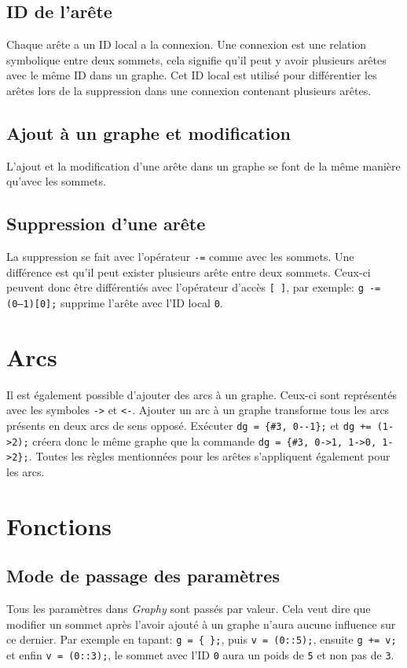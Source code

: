 \documentclass[french]{article}
\begin{document}
		\subsection{ID de l'arête}
		Chaque arête a un ID local a la connexion. Une connexion est une relation symbolique entre deux sommets, cela signifie qu'il peut y avoir plusieurs arêtes avec le même ID dans un graphe. Cet ID local est utilisé pour différentier les arêtes lors de la suppression dans une connexion contenant plusieurs arêtes.
	
		\subsection{Ajout à un graphe et modification}
		L'ajout et la modification d'une arête dans un graphe se font de la même manière qu'avec les sommets.
		
		\subsection{Suppression d'une arête}
		La suppression se fait avec l'opérateur \texttt{-=} comme avec les sommets. Une différence est qu'il peut exister plusieurs arête entre deux sommets. Ceux-ci peuvent donc être différentiés avec l'opérateur d'accès \texttt{[ ]}, par exemple: \texttt{g -= (0--1)[0];} supprime l'arête avec l'ID local \texttt{0}.
		
	\section{Arcs}
	Il est également possible d'ajouter des arcs à un graphe. Ceux-ci sont représentés avec les symboles \texttt{->} et \texttt{<-}. Ajouter un arc à un graphe transforme tous les arcs présents en deux arcs de sens opposé. Exécuter \texttt{dg = \{\#3, 0-{}-1\};} et \texttt{dg += (1->2);} créera donc le même graphe que la commande \texttt{dg = \{\#3, 0->1, 1->0, 1->2\};}. Toutes les règles mentionnées pour les arêtes s'appliquent également pour les arcs.
	
	\section{Fonctions}
		\subsection{Mode de passage des paramètres}
		Tous les paramètres dans \textit{Graphy} sont passés par valeur. Cela veut dire que modifier un sommet après l'avoir ajouté à un graphe n'aura aucune influence sur ce dernier. Par exemple en tapant: \texttt{g = \{ \};}, puis \texttt{v = (0::5);}, ensuite \texttt{g += v;} et enfin \texttt{v = (0::3);}, le sommet avec l'ID \texttt{0} aura un poids de \texttt{5} et non pas de \texttt{3}.
		
\end{document}
